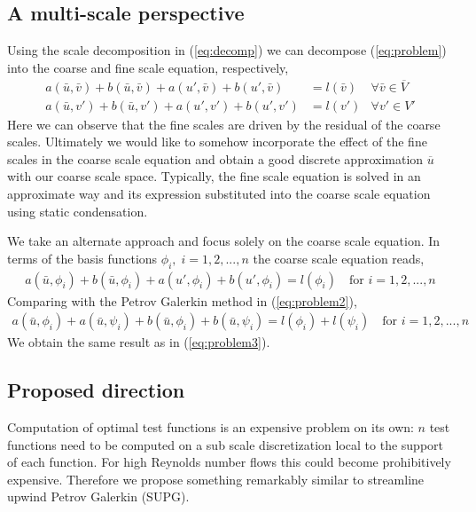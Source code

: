\subsection{A multi-scale perspective}
Using the scale decomposition in (\ref{eq:decomp}) we can decompose (\ref{eq:problem}) into the coarse and  fine scale equation, respectively,
\begin{align*}
	a(\bar{u} ,\bar{v}) + b(\bar{u},\bar{v})  + a(u',\bar{v}) + b(u',\bar{v}) &= l(\bar{v})  	& \forall \bar{v} \in \overline{V} \\
	a(\bar{u} ,v') + b(\bar{u},v')  + a(u',v') + b(u',v') &= l(v') 						& \forall v' \in V'
\end{align*}
Here we can observe that the fine scales are driven by the residual of the coarse scales. Ultimately we would like to somehow incorporate the effect of the fine scales in the coarse scale equation and obtain a good discrete approximation $\overline{u}$ with our coarse scale space. Typically, the fine scale equation is solved in an approximate way and its expression substituted into the coarse scale equation using static condensation.

We take an alternate approach and focus solely on the coarse scale equation. In terms of the basis functions $\phi_i, \; i = 1,2,...,n$ the coarse scale equation reads,
\begin{align*}
	a(\bar{u} ,\phi_i) + b(\bar{u},\phi_i)  + a(u', \phi_i) + b(u', \phi_i) = l(\phi_i) \quad \text{for } i = 1,2,...,n
\end{align*}
Comparing with the Petrov Galerkin method in (\ref{eq:problem2}),
\begin{align*}
	a(\bar{u} ,\phi_i) + a(\bar{u} ,\psi_i)  +  b(\bar{u},\phi_i) + b(\bar{u},\psi_i) = l(\phi_i) + l(\psi_i) \quad \text{for } i = 1,2,...,n
\end{align*}
We obtain the same result as in (\ref{eq:problem3}).


\subsection{Proposed direction}
Computation of optimal test functions is an expensive problem on its own: $n$ test functions need to be computed on a sub scale discretization local to the support of each function. For high Reynolds number flows this could become prohibitively expensive. Therefore we propose something remarkably similar to streamline upwind Petrov Galerkin (SUPG).

